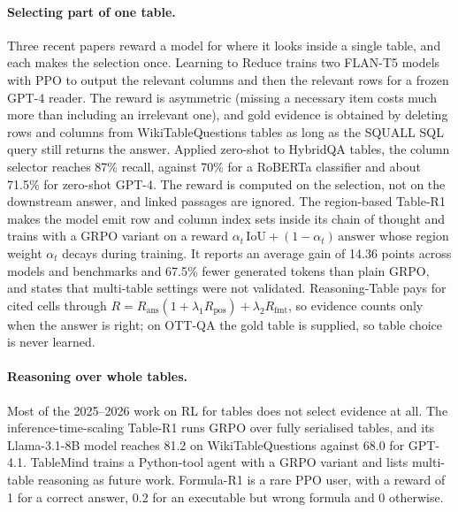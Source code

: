 \paragraph{Selecting part of one table.} Three recent papers reward a model for where it looks inside a single table, and each makes the selection once. Learning to Reduce \citep{lee2024learningtoreduce} trains two FLAN-T5 models with PPO to output the relevant columns and then the relevant rows for a frozen GPT-4 reader. The reward is asymmetric (missing a necessary item costs much more than including an irrelevant one), and gold evidence is obtained by deleting rows and columns from WikiTableQuestions tables as long as the SQUALL SQL query still returns the answer. Applied zero-shot to HybridQA tables, the column selector reaches 87\% recall, against 70\% for a RoBERTa classifier and about 71.5\% for zero-shot GPT-4. The reward is computed on the selection, not on the downstream answer, and linked passages are ignored. The region-based Table-R1 \citep{wu2025tabler1region} makes the model emit row and column index sets inside its chain of thought and trains with a GRPO variant on a reward $\alpha_t\,\mathrm{IoU}+(1-\alpha_t)\,\mathrm{answer}$ whose region weight $\alpha_t$ decays during training. It reports an average gain of 14.36 points across models and benchmarks and 67.5\% fewer generated tokens than plain GRPO, and states that multi-table settings were not validated. Reasoning-Table \citep{lei2025reasoningtable} pays for cited cells through $R=R_{\mathrm{ans}}(1+\lambda_1R_{\mathrm{pos}})+\lambda_2R_{\mathrm{fmt}}$, so evidence counts only when the answer is right; on OTT-QA the gold table is supplied, so table choice is never learned.

\paragraph{Reasoning over whole tables.} Most of the 2025--2026 work on RL for tables does not select evidence at all. The inference-time-scaling Table-R1 \citep{yang-etal-2025-table} runs GRPO over fully serialised tables, and its Llama-3.1-8B model reaches 81.2 on WikiTableQuestions against 68.0 for GPT-4.1. TableMind \citep{jiang2026tablemind} trains a Python-tool agent with a GRPO variant and lists multi-table reasoning as future work. Formula-R1 \citep{cao2025formular1} is a rare PPO user, with a reward of 1 for a correct answer, 0.2 for an executable but wrong formula and 0 otherwise.

